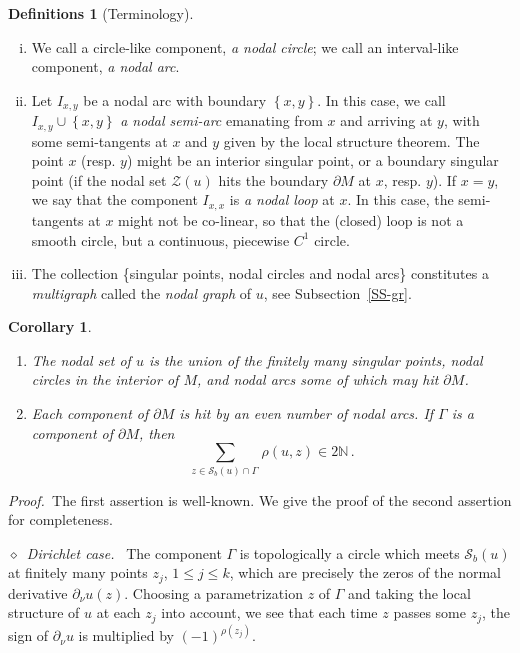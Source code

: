 \documentclass[12pt,a4paper]{amsart}
\theoremstyle{plain} %
\newtheorem{corollary}[theorem]{Corollary}
\theoremstyle{definition}
\newtheorem{definitions}[theorem]{Definitions}
\numberwithin{equation}{section}
\numberwithin{figure}{section}
\numberwithin{table}{section}
\newcommand{\N}{\mathbb{N}}
\newcommand{\cS}{\mathcal{S}}
\newcommand{\cZ}{\mathcal{Z}}
\newcommand{\pf}{\emph{Proof.~}}
\newcommand{\set}[1]{\left\lbrace #1 \right\rbrace}
\newcommand{\noid}{\noindent $\diamond$~}
\begin{document}
\begin{definitions}[Terminology]\label{D-evp2-01}\phantom{}
\begin{enumerate}[(i)]
\item We call a circle-like component, \emph{a nodal circle}; we call an interval-like component, \emph{a nodal arc}.
\item Let $I_{x,y}$ be a nodal arc with boundary $\set{x,y}$. In this case, we call $I_{x,y}\cup \set{x,y}$  \emph{a nodal semi-arc} emanating from $x$ and arriving at $y$, with some semi-tangents at $x$ and $y$ given by the local structure theorem. The point $x$ (resp. $y$) might be an interior singular point, or a boundary singular point (if the nodal set $\cZ(u)$ hits the boundary $\partial M$ at $x$, resp. $y$). If $x=y$, we say that the component $I_{x,x}$ is \emph{a nodal loop} at $x$. In this case, the semi-tangents at $x$ might not be co-linear, so that the (closed) loop is not a smooth circle, but a continuous, piecewise $C^1$ circle.
\item The collection \{singular points, nodal circles and nodal arcs\} constitutes a \emph{multigraph} called the \emph{nodal graph} of $u$, see Subsection~\ref{SS-gr}.
\end{enumerate}
\end{definitions}

\begin{corollary}\label{cor:nodinfo}\phantom{}
\begin{enumerate}
  \item The nodal set of $u$ is the union of the finitely many singular points, nodal circles in the interior of $M$, and nodal arcs some of which may hit  $\partial M$.
  \item Each component of $\partial M$ is hit by an even number of nodal arcs. If $\Gamma$ is a component of $\partial M$, then
      \begin{equation*}
        \sum_{z \in \cS_b(u) \cap \Gamma\,} \rho(u,z) \in 2\N\,.
      \end{equation*}
\end{enumerate}
\end{corollary}%

\pf The first assertion is well-known. We give the proof of the second assertion for completeness.\smallskip

\emph{\noid Dirichlet case.}~ The component $\Gamma$ is topologically a circle which meets $\cS_b(u)$ at finitely many points $z_j$, $1 \le j \le k$, which are precisely the zeros of the normal derivative $\partial_{\nu}u(z)$. Choosing a parametrization $z$ of $\Gamma$ and taking  the local structure of $u$ at each $z_j$ into account, we see that each time $z$ passes some $z_j$, the sign of $\partial_{\nu}u$ is multiplied by $(-1)^{\rho(z_j)}$. \smallskip
\end{document}
